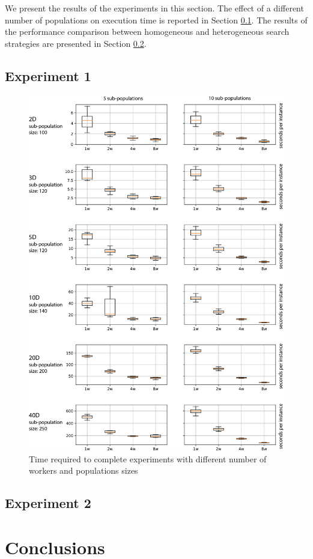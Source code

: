 \documentclass[review]{elsarticle}
\begin{document}
We present the results of the experiments in this section. The effect of a
different number of populations on execution time is reported in  Section
\ref{sec:exp1results}. The results of the performance comparison between homogeneous and
heterogeneous search strategies are presented in Section \ref{sec:exp2results}.     

\subsection{Experiment 1}
\label{sec:exp1results}

\begin{figure}[h!tb]
    \centering
    \includegraphics[width=\textwidth]{sp_size_worker}
    \caption{Time required to complete experiments with different number of workers and populations sizes }
    \label{fig:spworker}
\end{figure}

\subsection{Experiment 2}
\label{sec:exp2results}


\section{Conclusions} 
\label{conclusions}



\end{document}
